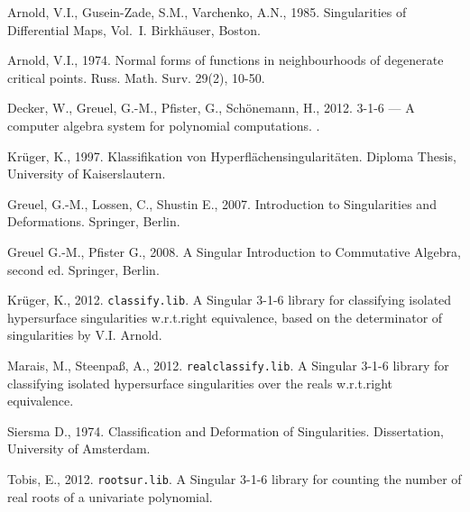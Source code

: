 \documentclass[noend]{amsproc}
\theoremstyle{definition}
\begin{document}
\begin{thebibliography}{99}

Arnold, V.I., Gusein-Zade, S.M., Varchenko, A.N., 1985.
Singularities of Differential Maps, Vol.~I.
Birkh\"auser, Boston.

Arnold, V.I., 1974.
Normal forms of functions in neighbourhoods of degenerate critical points.
Russ. Math. Surv. 29(2), 10-50.

Decker, W., Greuel, G.-M., Pfister, G., Sch{\"o}nemann, H., 2012.
 {3-1-6} --- {A} computer algebra system for polynomial
computations.
.

Kr\"uger, K., 1997.
Klassifikation von Hyperfl\"achensingularit\"aten.
Diploma Thesis, University of Kaiserslautern.

Greuel, G.-M., Lossen, C., Shustin E., 2007.
Introduction to Singularities and Deformations.
Springer, Berlin.

Greuel G.-M., Pfister G., 2008.
A Singular Introduction to Commutative Algebra, second ed.
Springer, Berlin.

Kr\"uger, K., 2012.
{\tt classify.lib}. {A} {\sc Singular} {3-1-6} library for classifying isolated
hypersurface singularities w.r.t.\@ right equivalence, based on the
determinator of singularities by V.I. Arnold.

Marais, M., Steenpa\ss, A., 2012.
{\tt realclassify.lib}. {A} {\sc Singular} {3-1-6} library for classifying
isolated hypersurface singularities over the reals w.r.t.\@ right equivalence.

Siersma D., 1974.
Classification and Deformation of Singularities.
Dissertation, University of Amsterdam.

Tobis, E., 2012.
{\tt rootsur.lib}. {A} {\sc Singular} {3-1-6} library for counting the number
of real roots of a univariate polynomial.

\end{thebibliography}
\end{document}
